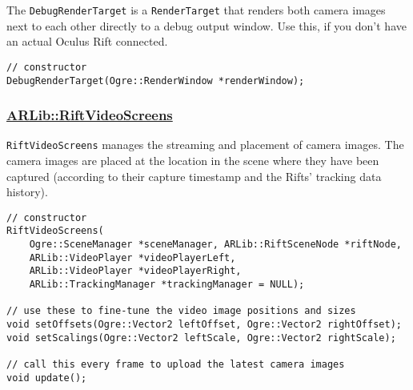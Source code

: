 The \texttt{DebugRenderTarget} is a \texttt{RenderTarget} that renders both camera images
next to each other directly to a debug output window. Use this, if you
don't have an actual Oculus Rift connected.

\begin{lstlisting}
// constructor
DebugRenderTarget(Ogre::RenderWindow *renderWindow);
\end{lstlisting}

\subsubsection{\texorpdfstring{\href{https://github.com/ands/OculusMeetsAR/blob/master/ARLib/include/ARLib/Ogre/RiftVideoScreens.h}{ARLib::RiftVideoScreens}}{ARLib::RiftVideoScreens}}\label{arlibriftvideoscreens}

\texttt{RiftVideoScreens} manages the streaming and placement of camera images.
The camera images are placed at the location in the scene where they
have been captured (according to their capture timestamp and the Rifts'
tracking data history).

\begin{lstlisting}
// constructor
RiftVideoScreens(
    Ogre::SceneManager *sceneManager, ARLib::RiftSceneNode *riftNode,
    ARLib::VideoPlayer *videoPlayerLeft,
    ARLib::VideoPlayer *videoPlayerRight,
    ARLib::TrackingManager *trackingManager = NULL);

// use these to fine-tune the video image positions and sizes
void setOffsets(Ogre::Vector2 leftOffset, Ogre::Vector2 rightOffset);
void setScalings(Ogre::Vector2 leftScale, Ogre::Vector2 rightScale);

// call this every frame to upload the latest camera images
void update();
\end{lstlisting}